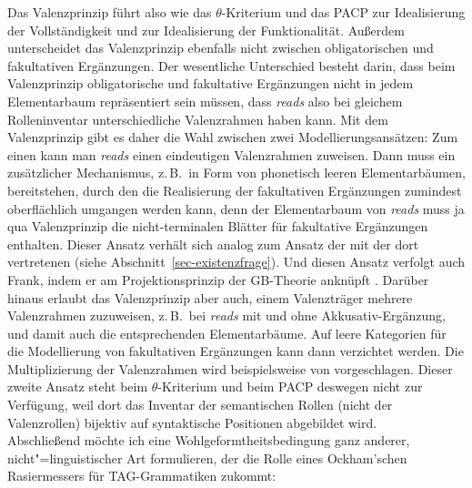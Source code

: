 Das Valenzprinzip führt also wie das $\theta$-Kriterium und das PACP zur Idealisierung der Vollständigkeit und zur Idealisierung der Funktionalität. Außerdem unterscheidet das Valenzprinzip ebenfalls nicht zwischen obligatorischen und fakultativen Ergänzungen. Der wesentliche Unterschied besteht darin, dass beim Valenzprinzip obligatorische und fakultative Ergänzungen nicht in jedem Elementarbaum repräsentiert sein müssen, dass \textit{reads} also bei gleichem Rolleninventar unterschiedliche Valenzrahmen haben kann. Mit dem Valenzprinzip gibt es daher die Wahl zwischen zwei Modellierungsansätzen: Zum einen kann man {\it reads} einen eindeutigen Valenzrahmen zuweisen. Dann muss ein zusätzlicher Mechanismus, z.\,B.\ in Form von phonetisch leeren Elementarbäumen, bereitstehen, durch den die Realisierung der fakultativen Ergänzungen zumindest oberflächlich umgangen werden kann, denn der Elementarbaum von \textit{reads} muss ja qua Valenzprinzip die nicht-terminalen Blätter für fakultative Ergänzungen enthalten. Dieser Ansatz verhält sich analog zum Ansatz der  mit der dort vertretenen  (siehe Abschnitt~\ref{sec-existenzfrage}). Und diesen Ansatz verfolgt auch Frank, indem er am Projektionsprinzip der GB-Theorie anknüpft \citep[64]{Frank:02}. Darüber hinaus erlaubt das Valenzprinzip aber auch, einem Valenzträger mehrere Valenzrahmen zuzuweisen, z.\,B.\ bei \textit{reads} mit und ohne Akkusativ-Ergänzung, und damit auch die entsprechenden Elementarbäume. Auf leere Kategorien für die Modellierung von fakultativen Ergänzungen kann dann verzichtet werden. Die Multiplizierung der Valenzrahmen wird beispielsweise von \cite{Jacobs:94a} vorgeschlagen. Dieser zweite Ansatz steht beim $\theta$-Kriterium und beim PACP deswegen nicht zur Verfügung, weil dort das Inventar der semantischen Rollen (nicht der Valenzrollen) bijektiv auf syntaktische Positionen abgebildet wird. \\

Abschlie\ss end möchte ich eine Wohlgeformtheitsbedingung ganz anderer, nicht"=linguistischer Art formulieren, der die Rolle eines Ockham'schen Rasiermessers für TAG-Grammatiken zukommt: 

